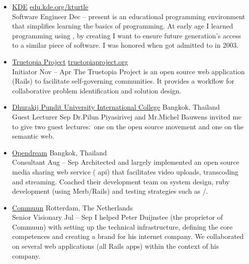 \documentclass[10pt,a4paper]{article}
\begin{document}
\begin{itemize}
  \item  %
  \headerrow
    {\href{http://www.kde.org}{KDE}}
    {\href{http://edu.kde.org/kturtle}{edu.kde.org/kturtle}}
  \\
  \subheaderrow
    {Software Engineer}
    {Dec  -- present}
  \KTurtle is an educational programming environment that simplifies learning the basics of programming. At early age I learned programming using , by creating \KTurtle I want to ensure future generation's access to a similar piece of software. I was honored when \KTurtle got admitted to  in 2003.

  \item  %
  \headerrow
    {\href{http://truetopiaproject.org}{Truetopia Project}}
    {\href{http://truetopiaproject.org}{truetopiaproject.org}}
  \\
  \subheaderrow
    {Initiator}
    {Nov  -- Apr }
  The Truetopia Project is an open source web application (Rails) to facilitate self-governing communities. It provides a workflow for collaborative problem identification and solution design.

\pagebreak

  \item  %
  \headerrow
    {\href{http://www.dpu.ac.th/dpuic}{Dhurakij Pundit University International College}}
    {\sc Bangkok, Thailand}
  \\
  \subheaderrow
    {Guest Lecturer}
    {Sep }
  Dr.\@ Pilun Piyasirivej and Mr.\@ Michel Bauwens invited me to give two guest lectures:\ one on the open source movement and one on the semantic web.

  \item  %
  \headerrow
    {\href{http://www.opendream.th}{Opendream}}
    {\sc Bangkok, Thailand}
  \\
  \subheaderrow
    { Consultant}
    {Aug  -- Sep }
  Architected and largely implemented an open source media sharing web service ( api) that facilitates video uploads, transcoding and streaming. Coached their development team on system design, ruby development (using Merb/Rails) and testing strategies such as /.

  \item  %
  \headerrow
    {\href{http://www.commuun.nl}{Commuun}}
    {\sc Rotterdam, The Netherlands}
  \\
  \subheaderrow
    {Senior Visionary}
    {Jul  -- Sep }
  I helped Peter Duijnstee (the proprietor of Commuun) with setting up the technical infrastructure, defining the core competences and creating a brand for his internet company. We collaborated on several web applications (all Rails apps) within the context of his company.


\end{itemize}
\end{document}
